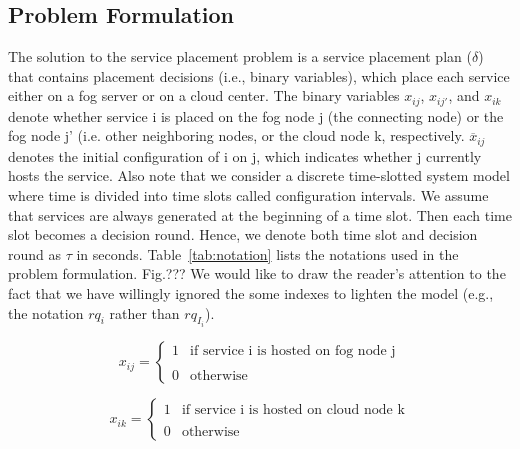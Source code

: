 \documentclass[twocolumn]{article}
\begin{document}
\subsection{Problem Formulation}
\par The solution to the service placement problem is a service placement plan ($\delta$) that contains placement decisions (i.e., binary variables), which place each service either on a fog server or on a cloud center. The binary variables ${x}_{ij}$, $x_{ij'}$, and ${x}_{ik}$ denote whether service i is placed on the fog node j (the connecting node) or the fog node j' (i.e. other neighboring nodes, or the cloud node k, respectively. $\overline{x}_{ij}$ denotes the initial configuration of i on j, which indicates whether j currently hosts the service.
Also note that we consider a discrete time-slotted system model where time is divided into time slots called configuration intervals. We assume that services are always generated at the beginning of a time slot. Then each time slot becomes a decision round. Hence, we denote both time slot and decision round as $\tau$ in seconds. Table~\ref{tab:notation} lists the notations used in the problem formulation. Fig.??? We would like to draw the reader's attention to the fact that we have willingly ignored the some indexes to lighten the model (e.g., the notation $rq_{i}$ rather than $rq_{I_{i}}$).

\begin{equation}
x_{ij} = \left\{
\begin{array}{rl}
1 & \text{if  service i is hosted on fog node j}\\
\label{eq:1}\\
0 & \text{otherwise}
\end{array} \right.
\end{equation}

\begin{equation}
x_{ik} = \left\{
\begin{array}{rl}
1 & \text{if service i is hosted on cloud node k}\\
\label{eq:2}\\
0 & \text{otherwise} 
\end{array} \right.
\end{equation}
\end{document}
